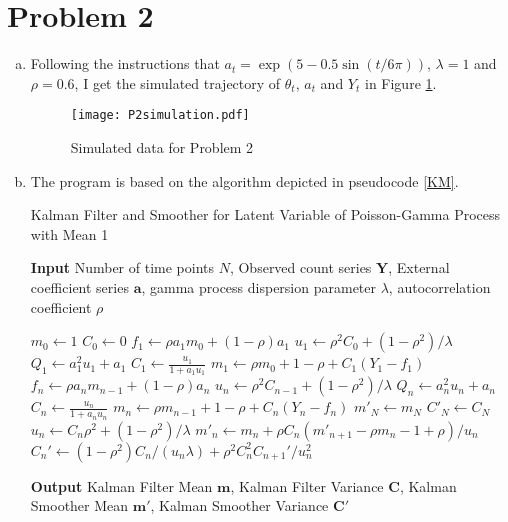 \documentclass[12pt]{article}
\begin{document}
\section*{Problem 2}

\begin{enumerate}[(a)]
	\item Following the instructions that $a_t = \exp(5-0.5\sin(t/6\pi))$, $\lambda=1$ and $\rho=0.6$, I get the simulated trajectory of $\theta_t$, $a_t$ and $Y_t$ in Figure \ref{P2simulation}.
	\begin{figure}[htbp]
		\centering
		\texttt{[image: P2simulation.pdf]}
		\caption{Simulated data for Problem 2}\label{P2simulation}
	\end{figure}
	\item The program is based on the algorithm depicted in pseudocode \ref{KM}.
	\begin{algorithm}[htbp]
	\caption{Kalman Filter and Smoother for Latent Variable of Poisson-Gamma Process with Mean 1}\label{KM}
	\hspace*{\algorithmicindent} \textbf{Input} Number of time points $N$,  Observed count series  $\bm{Y}$, External coefficient series $\bm{a}$, gamma process dispersion parameter $\lambda$, autocorrelation coefficient $\rho$
	
	\begin{algorithmic}[1]
	 	\State $m_{0} \gets 1$ 
	 	\State $C_0 \gets 0$
	 	\State $f_1 \gets \rho a_1  m_0 + (1-\rho)a_1$ 
	 	\State $u_1 \gets \rho^2 C_0 + (1-\rho^2)/\lambda$
		\State $Q_1 \gets a_{1}^2u_{1} + a_{1}$
		\State $C_1 \gets \frac{u_1}{1+a_1u_1}$ 
		\State $m_1 \gets \rho m_0 +1-\rho+C_1(Y_1-f_1)$
		 
		\State $f_n \gets \rho a_n  m_{n-1} + (1-\rho)a_n$ 
	 	\State $u_n \gets \rho^2 C_{n-1} + (1-\rho^2)/\lambda$
		\State $Q_n \gets a_{n}^2u_{n} + a_{n}$
		\State $C_n \gets \frac{u_n}{1+a_nu_n}$
		\State $m_n \gets \rho m_{n-1} +1-\rho+C_n(Y_n-f_n)$
		\EndFor
		\State $m'_{N} \gets m_{N}$ 
		\State $C'_{N} \gets C_{N}$
			\State $u_n \gets C_n\rho^2+(1-\rho^2)/\lambda$
			\State $m'_{n} \gets m_{n}+\rho C_n(m'_{n+1}-\rho m_{n} -1+\rho)/u_{n}$
			\State $C_{n}' \gets (1-\rho^2)C_{n}/(u_{n}\lambda) + \rho^2 C_{n}^2C_{n+1}'/u_{n}^2$
		\EndFor
	\end{algorithmic}
	
	\hspace*{\algorithmicindent} \textbf{Output} Kalman Filter Mean $\bm{m}$, Kalman Filter Variance $\bm{C}$, Kalman Smoother Mean $\bm{m}'$, Kalman Smoother Variance $\bm{C}'$
\end{algorithm}
	

\end{enumerate}
\end{document}
